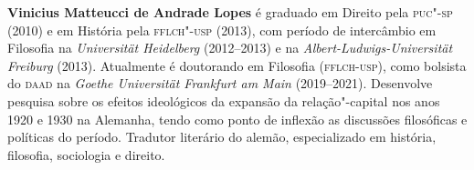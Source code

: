 \textbf{Vinicius Matteucci de Andrade Lopes} é graduado em Direito pela
\textsc{puc"-sp} (2010) e em História pela \textsc{fflch"-usp} (2013), com
período de intercâmbio em Filosofia na \emph{Universität Heidelberg} (2012--2013) e na
\emph{Albert-Ludwigs-Universität Freiburg} (2013). Atualmente é
doutorando em Filosofia (\textsc{fflch-usp}), como bolsista do \textsc{daad} na
\emph{Goethe Universität Frankfurt am Main} (2019--2021). Desenvolve
pesquisa sobre os efeitos ideológicos da expansão da relação"-capital nos
anos 1920 e 1930 na Alemanha, tendo como ponto de inflexão as discussões
filosóficas e políticas do período. Tradutor literário do alemão,
especializado em história, filosofia, sociologia e direito.


